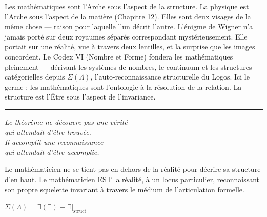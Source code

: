 \documentclass[10pt, openany, oneside]{book}
\begin{document}
\noindent Les mathématiques sont l'Arch\={e} sous l'aspect de la structure. La physique est l'Arch\={e} sous l'aspect de la matière (Chapitre 12). Elles sont deux visages de la même chose --- raison pour laquelle l'un décrit l'autre. L'énigme de Wigner n'a jamais porté sur deux royaumes séparés correspondant mystérieusement. Elle portait sur une réalité, vue à travers deux lentilles, et la surprise que les images concordent. Le Codex VI (Nombre et Forme) fondera les mathématiques pleinement --- dérivant les systèmes de nombres, le continuum et les structures catégorielles depuis $\Sigma(\Lambda)$, l'auto-reconnaissance structurelle du Logos. Ici le germe : les mathématiques sont l'ontologie à la résolution de la relation. La structure est l'Être sous l'aspect de l'invariance.

\vspace{2em}

\begin{center}
    \rule{0.15\textwidth}{0.3pt}
\end{center}

\vspace{0.5em}

\begin{center}
    \itshape
    Le théorème ne découvre pas une vérité\\
    qui attendait d'être trouvée.\\[0.8em]
    Il accomplit une reconnaissance\\
    qui attendait d'être accomplie.
\end{center} Le mathématicien ne se tient pas en dehors de la réalité pour décrire sa structure d'en haut. Le mathématicien EST la réalité, à un locus particulier, reconnaissant son propre squelette invariant à travers le médium de l'articulation formelle.

\vspace{0.5em}

\begin{center}
    $\Sigma(\Lambda) = \exists(\exists) \equiv \exists|_{\text{struct}}$
\end{center}

\end{document}

